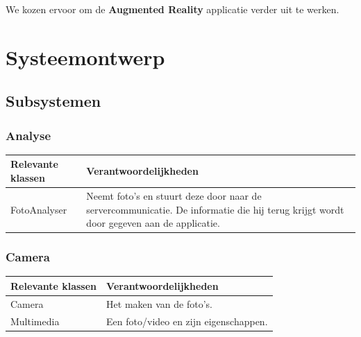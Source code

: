\documentclass[12pt,a4paper,oneside]{article}
\begin{document}

\pagestyle{fancy}
\fancyhf{}
\noindent We kozen ervoor om de \textbf{Augmented Reality} applicatie verder uit te werken.
\section{Systeemontwerp}
\subsection{Subsystemen}
\subsubsection*{Analyse}
\begin{longtable}{|p{5cm}|p{11cm}|}
\hline\rowcolor{Gray}
\textbf{Relevante klassen} & \textbf{Verantwoordelijkheden}\\ 
\hline
FotoAnalyser&Neemt foto's en stuurt deze door naar de servercommunicatie. De informatie die hij terug krijgt wordt door gegeven aan de applicatie. \\
\hline
\end{longtable}

\subsubsection*{Camera}
\begin{longtable}{|p{5cm}|p{11cm}|}
\hline\rowcolor{Gray}
\textbf{Relevante klassen} & \textbf{Verantwoordelijkheden}\\ 
\hline
Camera&Het maken van de foto's.\\
\hline
Multimedia&Een foto/video en zijn eigenschappen.\\
\hline
\end{longtable}
\end{document}
